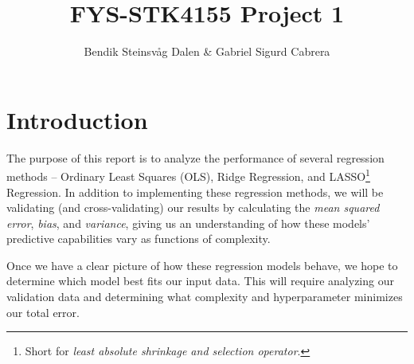 \documentclass[a4paper,10pt,english]{article}
\begin{document}
\title{FYS-STK4155 Project 1}
\author{Bendik Steinsvåg Dalen \& Gabriel Sigurd Cabrera}




\section{Introduction}
\label{sec:introduction}

The purpose of this report is to analyze the performance of several regression methods – Ordinary Least Squares (OLS), Ridge Regression, and LASSO\footnote{Short for \textit{least absolute shrinkage and selection operator}.} Regression.  In addition to implementing these regression methods, we will be validating (and cross-validating) our results by calculating the \textit{mean squared error}, \textit{bias}, and \textit{variance}, giving us an understanding of how these models' predictive capabilities vary as functions of complexity.

Once we have a clear picture of how these regression models behave, we hope to determine which model best fits our input data.  This will require analyzing our validation data and determining what complexity and hyperparameter minimizes our total error.

%
%
%
\end{document}
